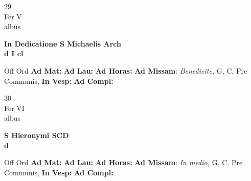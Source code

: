 \documentclass[10pt, openany]{book}
\begin{document}
        \begin{center}
            \begin{minipage}{3.5in}
                \vspace{2em}
                \begin{minipage}{0.5in}
                    {\Huge 29} \\
                    {\normalsize Fer V} \\
                    {\normalsize albus}
                \end{minipage}
                \begin{minipage}{3.0in}
                    \textbf{ \large In Dedicatione S Michaelis Arch \\
                    \textnormal{\normalsize d I cl}} \\ 
                \end{minipage}
                \begin{justify}Off Ord
                    \textbf{Ad Mat: }
                    \textbf{Ad Lau: }
                    \textbf{Ad Horas: }\textbf{Ad Missam}: \textit{Benedicite,} G, C, Pre Communis,  
                    \textbf{In Vesp: }
                    \textbf{Ad Compl: }
                \end{justify}
            \end{minipage}
        \end{center}
    
        \begin{center}
            \begin{minipage}{3.5in}
                \vspace{2em}
                \begin{minipage}{0.5in}
                    {\Huge 30} \\
                    {\normalsize Fer VI} \\
                    {\normalsize albus}
                \end{minipage}
                \begin{minipage}{3.0in}
                    \textbf{ \large S Hieronymi SCD \\
                    \textnormal{\normalsize d}} \\ 
                \end{minipage}
                \begin{justify}Off Ord
                    \textbf{Ad Mat: }
                    \textbf{Ad Lau: }
                    \textbf{Ad Horas: }\textbf{Ad Missam}: \textit{In medio,} G, C, Pre Communis,  
                    \textbf{In Vesp: }
                    \textbf{Ad Compl: }
                \end{justify}
            \end{minipage}
        \end{center}
    
\end{document}

